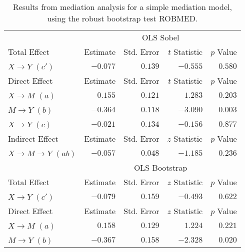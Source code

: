 \documentclass{article}\usepackage[]{graphicx}\usepackage[]{xcolor}
\begin{document}








\begin{table}[h!]
\caption{Results from mediation analysis for a simple mediation model, using the robust bootstrap test ROBMED.}
\begin{center}
\begin{tabular}{lrrrr}
\hline\noalign{\smallskip}
 & \multicolumn{4}{c}{OLS Sobel} \\ 
\noalign{\smallskip}\cline{2- 5 }\noalign{\smallskip}
Total Effect & Estimate & Std. Error & $t$ Statistic & $p$ Value \\ 
\noalign{\smallskip}\hline\noalign{\smallskip}
$X \rightarrow Y$ $(c')$ & $-0.077$ & $ 0.139$ & $-0.555$ & $ 0.580$ \\ 
\noalign{\smallskip}\hline\noalign{\smallskip}
Direct Effect & Estimate & Std. Error & $t$ Statistic & $p$ Value \\ 
\noalign{\smallskip}\hline\noalign{\smallskip}
$X \rightarrow M$ $(a)$ & $ 0.155$ & $ 0.121$ & $ 1.283$ & $ 0.203$ \\ 
$M \rightarrow Y$ $(b)$ & $-0.364$ & $ 0.118$ & $-3.090$ & $ 0.003$ \\ 
$X \rightarrow Y$ $(c)$ & $-0.021$ & $ 0.134$ & $-0.156$ & $ 0.877$ \\ 
\noalign{\smallskip}\hline\noalign{\smallskip}
Indirect Effect & Estimate & Std. Error & $z$ Statistic & $p$ Value \\ 
\noalign{\smallskip}\hline\noalign{\smallskip}
$X \rightarrow M \rightarrow Y$ $(ab)$ & $-0.057$ & $ 0.048$ & $-1.185$ & $ 0.236$ \\ 
\noalign{\smallskip}\hline\noalign{\smallskip}
 & \multicolumn{4}{c}{OLS Bootstrap} \\ 
\noalign{\smallskip}\cline{2- 5 }\noalign{\smallskip}
Total Effect & Estimate & Std. Error & $z$ Statistic & $p$ Value \\ 
\noalign{\smallskip}\hline\noalign{\smallskip}
$X \rightarrow Y$ $(c')$ & $-0.079$ & $ 0.159$ & $-0.493$ & $ 0.622$ \\ 
\noalign{\smallskip}\hline\noalign{\smallskip}
Direct Effect & Estimate & Std. Error & $z$ Statistic & $p$ Value \\ 
\noalign{\smallskip}\hline\noalign{\smallskip}
$X \rightarrow M$ $(a)$ & $ 0.158$ & $ 0.129$ & $ 1.224$ & $ 0.221$ \\ 
$M \rightarrow Y$ $(b)$ & $-0.367$ & $ 0.158$ & $-2.328$ & $ 0.020$ \\ 

\end{tabular}
\end{center}
\end{table}
\end{document}
